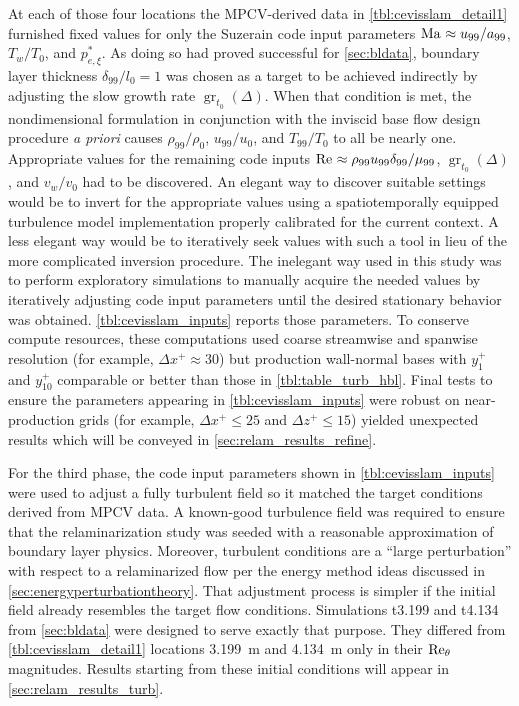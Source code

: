 At each of those four locations the MPCV-derived data in
\autoref{tbl:cevisslam_detail1} furnished fixed values for only
the Suzerain code input parameters $\Mach\approx{} u_{99} /
a_{99}$, $T_w/T_0$, and $p_{e,\xi}^{\ast}$.
%
As doing so had proved successful for \autoref{sec:bldata},
boundary layer thickness $\delta_{99}/l_0=1$ was chosen as a
target to be achieved indirectly by adjusting the slow growth rate
$\operatorname{gr}_{t_0}\!\left(\Delta\right)$.
%
When that condition is met, the nondimensional formulation in conjunction with
the inviscid base flow design procedure \emph{a priori} causes $\rho_{99} /
\rho_0$, $u_{99} / u_0$, and $T_{99} / T_0$ to all be nearly one.
%
Appropriate values for the remaining code inputs $\Reynolds\approx \rho_{99}
u_{99} \delta_{99} / \mu_{99}$, $\operatorname{gr}_{t_0}\!\left(\Delta\right)$,
and $v_w/v_0$ had to be discovered.
%
An elegant way to discover suitable settings would be to invert for the
appropriate values using a spatiotemporally equipped turbulence model
implementation properly calibrated for the current context.
%
A less elegant way would be to iteratively seek values with such a tool in lieu
of the more complicated inversion procedure.
%
The inelegant way used in this study was to perform exploratory simulations to
manually acquire the needed values by iteratively adjusting code input
parameters until the desired stationary behavior was obtained.
%
\autoref{tbl:cevisslam_inputs} reports those parameters.
%
To conserve compute resources, these computations used coarse streamwise and
spanwise resolution (for example, $\Delta{}x^{+}\approx{}30$) but production
wall-normal bases with $y^{+}_1$ and $y^{+}_{10}$ comparable or better than
those in \autoref{tbl:table_turb_hbl}.
%
Final tests to ensure the parameters appearing in \autoref{tbl:cevisslam_inputs}
were robust on near-production grids (for example, $\Delta{}x^{+}\leq{}25$ and
$\Delta{}z^{+}\leq{}15$) yielded unexpected results which will be conveyed in
\autoref{sec:relam_results_refine}.



For the third phase, the code input parameters shown in
\autoref{tbl:cevisslam_inputs} were used to adjust a fully turbulent field so
it matched the target conditions derived from MPCV data.
%
A known-good turbulence field was required to ensure that the relaminarization
study was seeded with a reasonable approximation of boundary layer physics.
Moreover, turbulent conditions are a ``large perturbation'' with respect
to a relaminarized flow per the energy method ideas discussed in
\autoref{sec:energyperturbationtheory}.
%
That adjustment process
is simpler if the initial field already resembles the target flow conditions.
Simulations t3.199 and t4.134 from \autoref{sec:bldata} were designed to serve
exactly that purpose.  They differed from \autoref{tbl:cevisslam_detail1} locations 3.199~m and 4.134~m only in
their $\Reynolds[\theta]{}$ magnitudes.
%
Results starting from these initial conditions will appear in
\autoref{sec:relam_results_turb}.

